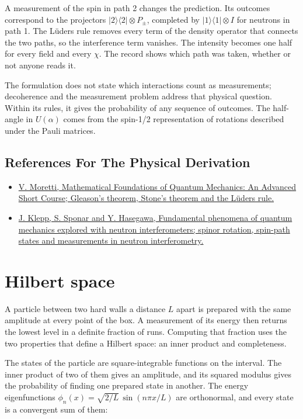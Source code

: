 \documentclass[11pt,oneside]{book}
\begin{document}
A measurement of the spin in path 2 changes the prediction. Its outcomes correspond to the projectors \(|2\rangle\langle2|\otimes P_\pm\), completed by \(|1\rangle\langle1|\otimes I\) for neutrons in path 1. The Lüders rule removes every term of the density operator that connects the two paths, so the interference term vanishes. The intensity becomes one half for every field and every \(\chi\). The record shows which path was taken, whether or not anyone reads it.

The formulation does not state which interactions count as measurements; decoherence and the measurement problem address that physical question. Within its rules, it gives the probability of any sequence of outcomes. The half-angle in \(U(\alpha)\) comes from the spin-1/2 representation of rotations described under the Pauli matrices.

\subsection*{References For The Physical Derivation}
\begin{itemize}
\item \href{https://arxiv.org/abs/1508.06951}{V. Moretti, Mathematical Foundations of Quantum Mechanics: An Advanced Short Course; Gleason's theorem, Stone's theorem and the Lüders rule.}
\item \href{https://arxiv.org/abs/1407.2526}{J. Klepp, S. Sponar and Y. Hasegawa, Fundamental phenomena of quantum mechanics explored with neutron interferometers; spinor rotation, spin-path states and measurements in neutron interferometry.}
\end{itemize}





\clearpage

\section{Hilbert space}

\label{topic:hilbert-space}

A particle between two hard walls a distance \(L\) apart is prepared with the same amplitude at every point of the box. A measurement of its energy then returns the lowest level in a definite fraction of runs. Computing that fraction uses the two properties that define a Hilbert space: an inner product and completeness.

The states of the particle are square-integrable functions on the interval. The inner product of two of them gives an amplitude, and its squared modulus gives the probability of finding one prepared state in another. The energy eigenfunctions \(\phi_n(x)=\sqrt{2/L}\,\sin(n\pi x/L)\) are orthonormal, and every state is a convergent sum of them:
\end{document}

